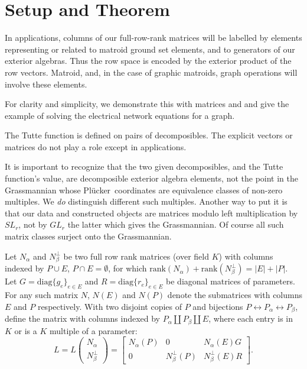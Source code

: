 \documentclass[Unicode]{cedram-alco}
\newcommand{\Plucker}{Pl\"{u}cker\ }
\newcommand{\Nal}{\ensuremath{N_{\alpha}}}
\newcommand{\NbePe}{\ensuremath{N_{\beta}^{\perp}}}
\newcommand{\dunion}{\coprod}
\begin{document}
\section{Setup and Theorem}

\noindent
In applications, columns of our full-row-rank matrices will be labelled by elements representing
or related to matroid ground set elements, and to generators of our exterior algebras.
Thus the row space is encoded by the exterior product of the row vectors. Matroid, and,
in the case of graphic matroids, graph operations will involve these elements.   

For clarity and simplicity, we demonstrate this with matrices and
and give the example of solving the electrical network equations for a graph.

The Tutte function is defined
on pairs of decomposibles.
The explicit vectors
or matrices do not play a role except in applications.

It is important to recognize that the two given decomposibles, and the Tutte function's
value, are decomposible exterior algebra elements,
not the point in the Grassmannian
whose \Plucker coordinates are equivalence classes of non-zero multiples.
We \emph{do} distinguish different such multiples.  Another way
to put it is that our data and constructed objects are matrices modulo left multiplication
by $SL_r$, not by $GL_r$ the latter which gives the Grassmannian.
Of course all such matrix classes surject onto the Grassmannian.


Let $\Nal$ and $\NbePe$ be two full row rank matrices (over field $K$)
with columns indexed by $P\cup E$, $P\cap E=\emptyset$,
for which $\text{rank}(\Nal)+\text{rank}(\NbePe)=|E|+|P|$.
Let
$G=\text{diag}\{g_e\}_{e\in E} $ and $R=\text{diag}\{r_e\}_{e\in E}$
be diagonal matrices of parameters.  For any such matrix $N$, $N(E)$ and
$N(P)$ denote the submatrices with columns $E$ and $P$ respectively. With
two disjoint copies of $P$ and bijections
$P \leftrightarrow P_{\alpha}\leftrightarrow P_{\beta}$, define the matrix
with columns indexed by $P_\alpha \dunion P_\beta \dunion E$, where each entry
is in $K$ or is a $K$ multiple of a parameter:
\begin{equation}\label{LmatrixDef}
    L = L\left(\begin{array}{cc} {\Nal} \\ {\NbePe}  \end{array}\right)
    = \left[\begin{array}{c|c|c} \Nal(P)  &  0  &  \Nal(E)G \\  \hline
        0  & \NbePe(P)  &  \NbePe(E)R \end{array}\right].
\end{equation}
\end{document}
